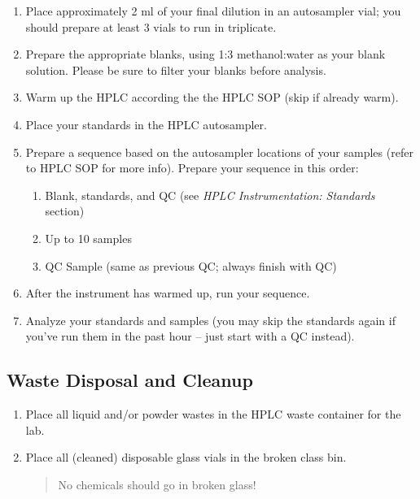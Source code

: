\documentclass[]{tufte-book}
\providecommand{\tightlist}{%
  \setlength{\itemsep}{0pt}\setlength{\parskip}{0pt}}
\begin{document}
\begin{enumerate}
\def\labelenumi{\arabic{enumi}.}
\tightlist
\item
  Place approximately 2 ml of your final dilution in an autosampler vial; you should prepare at least 3 vials to run in triplicate.
\item
  Prepare the appropriate blanks, using 1:3 methanol:water as your blank solution. Please be sure to filter your blanks before analysis.
\item
  Warm up the HPLC according the the HPLC SOP (skip if already warm).
\item
  Place your standards in the HPLC autosampler.
\item
  Prepare a sequence based on the autosampler locations of your samples (refer to HPLC SOP for more info). Prepare your sequence in this order:

  \begin{enumerate}
  \def\labelenumii{\arabic{enumii}.}
  \tightlist
  \item
    Blank, standards, and QC (see \emph{HPLC \textbar{} Instrumentation: Standards} section)
  \item
    Up to 10 samples
  \item
    QC Sample (same as previous QC; always finish with QC)
  \end{enumerate}
\item
  After the instrument has warmed up, run your sequence.
\item
  Analyze your standards and samples (you may skip the standards again if you've run them in the past hour -- just start with a QC instead).
\end{enumerate}

\hypertarget{waste-disposal-and-cleanup-4}{%
\subsection{Waste Disposal and Cleanup}\label{waste-disposal-and-cleanup-4}}

\begin{enumerate}
\def\labelenumi{\arabic{enumi}.}
\item
  Place all liquid and/or powder wastes in the HPLC waste container for the lab.
\item
  Place all (cleaned) disposable glass vials in the broken class bin.

  \begin{quote}
  No chemicals should go in broken glass!
  \end{quote}
\end{enumerate}
\end{document}
